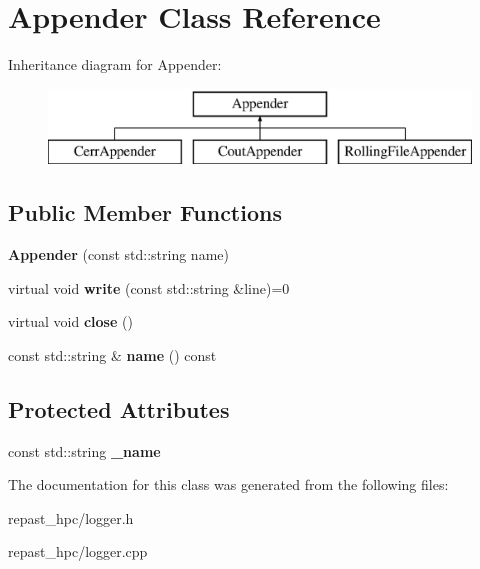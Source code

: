 \hypertarget{class_appender}{\section{Appender Class Reference}
\label{class_appender}
}
Inheritance diagram for Appender\-:\begin{figure}[H]
\begin{center}
\leavevmode
\includegraphics[height=2.000000cm]{class_appender}
\end{center}
\end{figure}
\subsection*{Public Member Functions}
\begin{DoxyCompactItemize}
\item 
\hypertarget{class_appender_a2ad482c763a284fdb8d3dd46c83481ab}{{\bfseries Appender} (const std\-::string name)}\label{class_appender_a2ad482c763a284fdb8d3dd46c83481ab}

\item 
\hypertarget{class_appender_a0e67ca1a0f85984feb8b3088f764b6e7}{virtual void {\bfseries write} (const std\-::string \&line)=0}\label{class_appender_a0e67ca1a0f85984feb8b3088f764b6e7}

\item 
\hypertarget{class_appender_ab042540fad5293516d82b9430e110aed}{virtual void {\bfseries close} ()}\label{class_appender_ab042540fad5293516d82b9430e110aed}

\item 
\hypertarget{class_appender_ae043a5d21e342d46243c12e79cd4e256}{const std\-::string \& {\bfseries name} () const }\label{class_appender_ae043a5d21e342d46243c12e79cd4e256}

\end{DoxyCompactItemize}
\subsection*{Protected Attributes}
\begin{DoxyCompactItemize}
\item 
\hypertarget{class_appender_a6e4dd248b35257d47a5e7befad4ef6aa}{const std\-::string {\bfseries \-\_\-name}}\label{class_appender_a6e4dd248b35257d47a5e7befad4ef6aa}

\end{DoxyCompactItemize}


The documentation for this class was generated from the following files\-:\begin{DoxyCompactItemize}
\item 
repast\-\_\-hpc/logger.\-h\item 
repast\-\_\-hpc/logger.\-cpp\end{DoxyCompactItemize}
